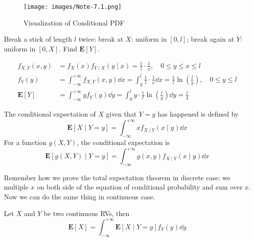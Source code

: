 \documentclass[device=normal, lang=en]{elegantbook}
\numberwithin{equation}{section}
\begin{document}
\begin{figure}[H]
    \centering
    \texttt{[image: images/Note-7.1.png]}
    \caption{Visualization of Conditional PDF}
\end{figure}

\begin{example}
    Break a stick of length $l$ twice: break at $X$: uniform in $[0, l]$; break again at $Y$: uniform in $[0, X]$. Find $\mathbf{E}[Y]$. 
    \begin{solution}
        \begin{align}
            f_{X, Y}(x, y) &= f_{X}(x) f_{Y \mid X}(y \mid x) = \frac{1}{l} \cdot \frac{1}{x}, \quad 0 \leq y \leq x \leq l \\ 
            f_{Y}(y) &= \int_{-\infty}^{+\infty} f_{X, Y}(x, y) \dd{x} = \int_{y}^{l} \frac{1}{l} \cdot \frac{1}{x} \dd{x} = \frac{1}{l} \ln\left(\frac{l}{y}\right), \quad 0 \leq y \leq l \\ 
            \mathbf{E}[Y] &= \int_{-\infty}^{+\infty} y f_{Y}(y) \dd{y} = \int_{0}^{l} y \cdot \frac{1}{l} \ln\left(\frac{l}{y}\right) \dd{y} = \frac{l}{4}
        \end{align}
    \end{solution}
\end{example}

\begin{definition}
    The conditional expectation of $X$ given that $Y = y$ has happened is defined by
    \begin{equation}
        \mathbf{E}[X \mid Y = y] = \int_{-\infty}^{+\infty} x f_{X \mid Y}(x \mid y) \dd{x}
    \end{equation}
    For a function $g(X, Y)$, the conditional expectation is 
    \begin{equation}
        \mathbf{E}[g(X, Y) \mid Y = y] = \int_{-\infty}^{+\infty} g(x, y) f_{X \mid Y}(x \mid y) \dd{x}
    \end{equation}
\end{definition}

Remember how we prove the total expectation theorem in discrete case: we multiple $x$ on both side of the equation of conditional probability and sum over $x$. Now we can do the same thing in continuous case.
\begin{theorem}
    Let $X$ and $Y$ be two continuous RVs, then
    \begin{equation}
        \mathbf{E}[X] = \int_{-\infty}^{+\infty} \mathbf{E}[X \mid Y = y] f_{Y}(y) \dd{y}
    \end{equation}
\end{theorem}
\end{document}

